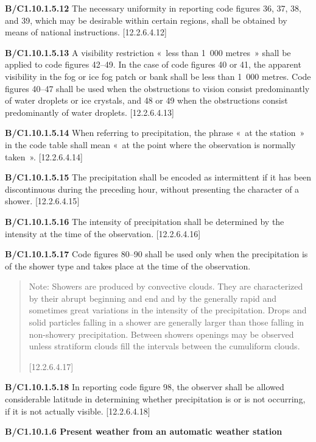 \textbf{B/C1.10.1.5.12} The necessary uniformity in reporting code figures 36, 37, 38, and 39, which may be desirable within certain regions, shall be obtained by means of national instructions. {[}12.2.6.4.12{]}

\textbf{B/C1.10.1.5.13} A visibility restriction «~less than 1~000 metres~» shall be applied to code figures 42--49. In the case of code figures 40 or 41, the apparent visibility in the fog or ice fog patch or bank shall be less than 1~000 metres. Code figures 40--47 shall be used when the obstructions to vision consist predominantly of water droplets or ice crystals, and 48 or 49 when the obstructions consist predominantly of water droplets. {[}12.2.6.4.13{]}

\textbf{B/C1.10.1.5.14} When referring to precipitation, the phrase «~at the station~» in the code table shall mean «~at the point where the observation is normally taken~». {[}12.2.6.4.14{]}

\textbf{B/C1.10.1.5.15} The precipitation shall be encoded as intermittent if it has been discontinuous during the preceding hour, without presenting the character of a shower. {[}12.2.6.4.15{]}

\textbf{B/C1.10.1.5.16} The intensity of precipitation shall be determined by the intensity at the time of the observation. {[}12.2.6.4.16{]}

\textbf{B/C1.10.1.5.17} Code figures 80--90 shall be used only when the precipitation is of the shower type and takes place at the time of the observation.

\begin{quote}
Note: Showers are produced by convective clouds. They are characterized by their abrupt beginning and end and by the generally rapid and sometimes great variations in the intensity of the precipitation. Drops and solid particles falling in a shower are generally larger than those falling in non-showery precipitation. Between showers openings may be observed unless stratiform clouds fill the intervals between the cumuliform clouds.

{[}12.2.6.4.17{]}
\end{quote}

\textbf{B/C1.10.1.5.18} In reporting code figure 98, the observer shall be allowed considerable latitude in determining whether precipitation is or is not occurring, if it is not actually visible. {[}12.2.6.4.18{]}

\textbf{B/C1.10.1.6 Present weather from an automatic weather station}

